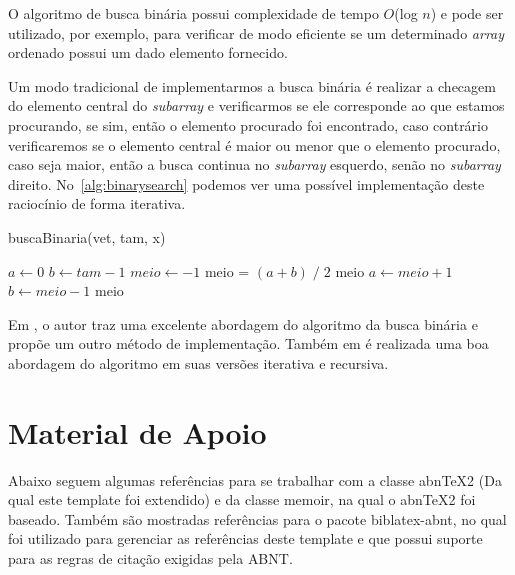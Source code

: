 \documentclass[
	12pt,    %
	oneside, %
	a4paper, %
	chapter=TITLE, %
	section=TITLE, %
	sumario=tradicional, %
	english, %
	brazil   %
] {abntex2}
\begin{document}
	O algoritmo de \textsf{busca binária} possui complexidade de tempo $O$(log $n$) e pode ser utilizado, por exemplo, para verificar de modo eficiente se um determinado \textit{array} ordenado possui um dado elemento fornecido.
	
	Um modo tradicional de implementarmos a busca binária é realizar a checagem do elemento central do \textit{subarray} e verificarmos se ele corresponde ao que estamos procurando, se sim, então o elemento procurado foi encontrado, caso contrário verificaremos se o elemento central é maior ou menor que o elemento procurado, caso seja maior, então a busca continua no \textit{subarray} esquerdo, senão no \textit{subarray} direito. No~\autoref{alg:binarysearch} podemos ver uma possível implementação deste raciocínio de forma iterativa.
	
	\vspace{.5cm}		
	\begin{algorithm}[H]
		\linespread{1}\selectfont
		\caption{\textsf{buscaBinaria(vet, tam, x)}}
		\label{alg:binarysearch}			
		$a \gets 0$\;
		$b \gets tam - 1$\;
		$meio \gets -1$\;
		 {
			meio = $(a + b) \; / \; 2$\;
			 {
				\Retorna meio 
			} 
			 {
				$a \gets meio + 1$\;
			} {
				$b \gets meio - 1$\;
			}
		}
		\Retorna meio 		
	\end{algorithm}
	\vspace{.5cm}		

	Em \textcite{laaksonen2017}, o autor traz uma excelente abordagem do algoritmo da \textsf{busca binária} e propõe um outro método de implementação. Também em \cite{programizsite} é realizada uma boa abordagem do algoritmo em suas versões iterativa e recursiva.
	
	\chapter{Material de Apoio}\label{sec:material-apoio}
	Abaixo seguem algumas referências para se trabalhar com a classe \textsf{abn\TeX 2} (Da qual este template foi extendido) e da classe \textsf{memoir}, na qual o \textsf{abn\TeX 2} foi baseado. Também são mostradas referências para o pacote \textsf{biblatex-abnt}, no qual foi utilizado para gerenciar as referências deste template e que possui suporte para as regras de citação exigidas pela ABNT. 
	
\end{document}

